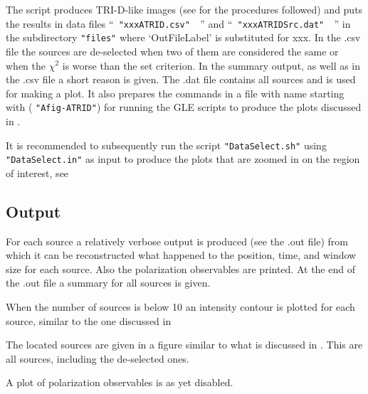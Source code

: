 The script produces TRI-D-like images (see  for the procedures followed)
and puts the results in data files ``\verb# "xxxATRID.csv"  #'' and ``\verb# "xxxATRIDSrc.dat"  #'' in the subdirectory \verb!"files"! where `OutFileLabel' is substituted for xxx. In the .csv file the sources are de-selected when two of them are considered the same or when the $\chi^2$ is worse than the set criterion. In the summary output, as well as in the .csv file a short reason is given. The .dat file contains all sources and is used for making a plot.  It also prepares the commands in a file with name starting with ( \verb!"Afig-ATRID"!) for running the GLE scripts \cite{GLE} to produce the plots discussed in .

It is recommended to subsequently run the script \verb!"DataSelect.sh"! using \verb!"DataSelect.in"! as input to produce the plots that are zoomed in on the region of interest, see 

\subsection{Output}

For each source a relatively verbose output is produced (see the .out file) from which it can be reconstructed what happened to the position, time, and window size for each source. Also the polarization observables are printed. At the end of the .out file a summary for all sources is given.

When the number of sources is below 10 an intensity contour is plotted for each source, similar to the one discussed in 

The located sources are given in a figure similar to what is discussed in . This are all sources, including the de-selected ones.

A plot of polarization observables is as yet disabled.


